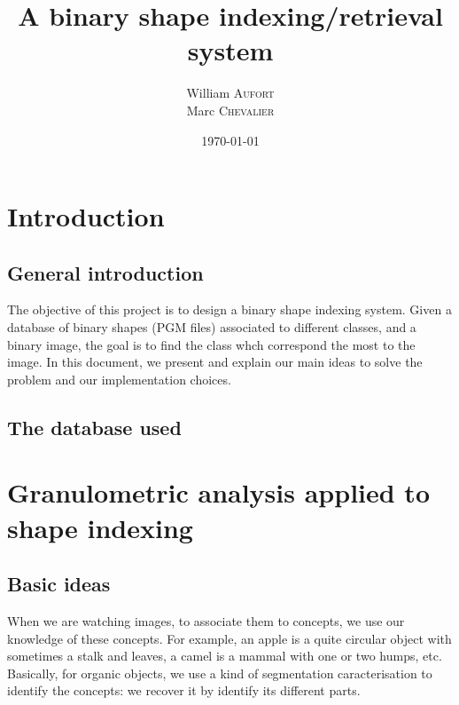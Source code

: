 

\title{A binary shape indexing/retrieval system}
\author{
    William \textsc{Aufort}\\
    Marc \textsc{Chevalier}
}
\date{\today}


\maketitle

\section*{Introduction}

\subsection*{General introduction}

The objective of this project is to design a binary shape indexing system. Given a database of binary shapes (PGM files) associated to different classes, and a binary image, the goal is to find the class whch correspond the most to the image. In this document, we present and explain our main ideas to solve the problem and our implementation choices.

\subsection*{The database used}


\section{Granulometric analysis applied to shape indexing}

\subsection{Basic ideas}

When we are watching images, to associate them to concepts, we use our knowledge of these concepts. For example, an apple is a quite circular object with sometimes a stalk and leaves, a camel is a mammal with one or two humps, etc. Basically, for organic objects, we use a kind of segmentation caracterisation to identify the concepts: we recover it by identify its different parts.

